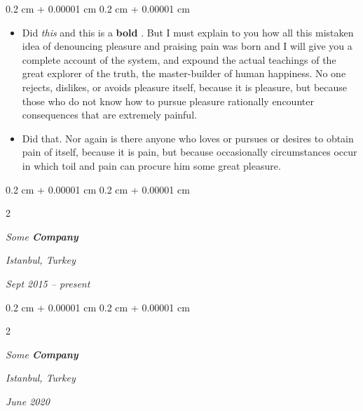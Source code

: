\documentclass[10pt, letterpaper]{article}
\newenvironment{highlights}{
    \begin{itemize}[
        topsep=0.10 cm,
        parsep=0.10 cm,
        partopsep=0pt,
        itemsep=0pt,
        leftmargin=0.4 cm + 10pt
    ]
}{
    \end{itemize}
} %
\newenvironment{onecolentry}{
    \begin{adjustwidth}{
        0.2 cm + 0.00001 cm
    }{
        0.2 cm + 0.00001 cm
    }
}{
    \end{adjustwidth}
} %
\newenvironment{twocolentry}[2][]{
    \onecolentry
    \def\secondColumn{#2}
    \setcolumnwidth{\fill, 4.5 cm}
    \begin{paracol}{2}
}{
    \switchcolumn \raggedleft \secondColumn
    \end{paracol}
    \endonecolentry
} %
\let\hrefWithoutArrow\href
\renewcommand{\href}[2]{\hrefWithoutArrow{#1}{\ifthenelse{\equal{#2}{}}{ }{#2 }\raisebox{.15ex}{\footnotesize \faExternalLink*}}}
\begin{document}
        \vspace{0.10 cm}
        \begin{onecolentry}
            \begin{highlights}
                \item Did \textit{this} and this is a \textbf{bold} \href{https://example.com}{link}. But I must explain to you how all this mistaken idea of denouncing pleasure and praising pain was born and I will give you a complete account of the system, and expound the actual teachings of the great explorer of the truth, the master-builder of human happiness. No one rejects, dislikes, or avoids pleasure itself, because it is pleasure, but because those who do not know how to pursue pleasure rationally encounter consequences that are extremely painful.
                \item Did that. Nor again is there anyone who loves or pursues or desires to obtain pain of itself, because it is pain, but because occasionally circumstances occur in which toil and pain can procure him some great pleasure.
            \end{highlights}
        \end{onecolentry}


        \vspace{0.2 cm}

            \begin{twocolentry}{
        \textit{Istanbul, Turkey}

        \textit{Sept 2015 – present}    }
                \textbf{}

                \textit{Some \textbf{Company}}
            \end{twocolentry}



        \vspace{0.2 cm}

            \begin{twocolentry}{
        \textit{Istanbul, Turkey}

        \textit{June 2020}    }
                \textbf{}

                \textit{Some \textbf{Company}}
            \end{twocolentry}
\end{document}
